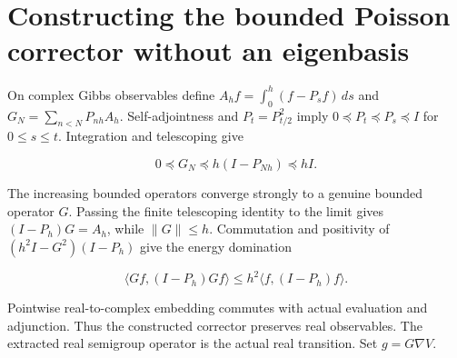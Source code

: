 \documentclass[11pt,a4paper]{article}
\begin{document}
\section{\texorpdfstring{Constructing the bounded Poisson corrector without an eigenbasis}{Constructing the bounded Poisson corrector without an eigenbasis}}


On complex Gibbs observables define
    \(A_hf=\int_0^h(f-P_sf)\,ds\) and
    \(G_N=\sum_{n<N}P_{nh}A_h\).
    Self-adjointness and \(P_t=P_{t/2}^2\) imply
    \(0\preccurlyeq P_t\preccurlyeq P_s\preccurlyeq I\) for
    \(0\le s\le t\). Integration and telescoping give


    \[0\preccurlyeq G_N\preccurlyeq h(I-P_{Nh})\preccurlyeq hI.\]


The increasing bounded operators converge strongly to a genuine
    bounded operator \(G\). Passing the finite telescoping identity to the
    limit gives \((I-P_h)G=A_h\), while
    \(\|G\|\le h\). Commutation and positivity of
    \((h^2I-G^2)(I-P_h)\) give the energy domination


    \[\langle Gf,(I-P_h)Gf\rangle
      \le h^2\langle f,(I-P_h)f\rangle.\]


Pointwise real-to-complex embedding commutes with actual evaluation
    and adjunction. Thus the constructed corrector preserves real
    observables. The extracted real semigroup operator is the actual real
    transition. Set \(g=G\nabla V\).
\end{document}
